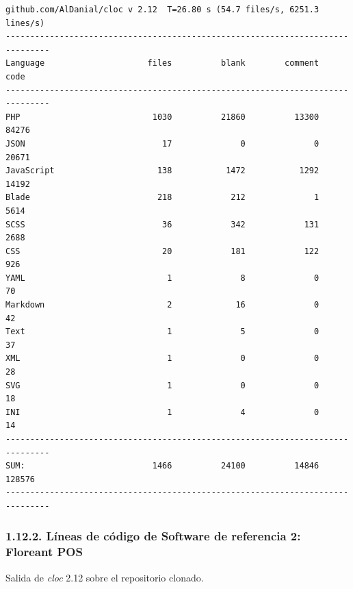 \begin{verbatim}
github.com/AlDanial/cloc v 2.12  T=26.80 s (54.7 files/s, 6251.3 lines/s)
-------------------------------------------------------------------------------
Language                     files          blank        comment           code
-------------------------------------------------------------------------------
PHP                           1030          21860          13300          84276
JSON                            17              0              0          20671
JavaScript                     138           1472           1292          14192
Blade                          218            212              1           5614
SCSS                            36            342            131           2688
CSS                             20            181            122            926
YAML                             1              8              0             70
Markdown                         2             16              0             42
Text                             1              5              0             37
XML                              1              0              0             28
SVG                              1              0              0             18
INI                              1              4              0             14
-------------------------------------------------------------------------------
SUM:                          1466          24100          14846         128576
-------------------------------------------------------------------------------
\end{verbatim}
\endgroup

\subsubsection{1.12.2. Líneas de código de Software de referencia 2: Floreant POS}

Salida de \textit{cloc} 2.12 sobre el repositorio clonado.

